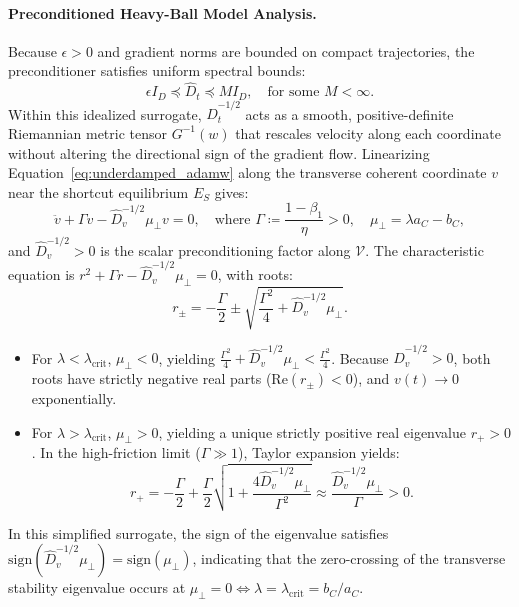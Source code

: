 \documentclass{article}
\theoremstyle{plain}
\theoremstyle{definition}
\begin{document}
\paragraph{Preconditioned Heavy-Ball Model Analysis.}
Because $\epsilon > 0$ and gradient norms are bounded on compact trajectories, the preconditioner satisfies uniform spectral bounds:
\begin{equation}
    \epsilon I_D \preceq \hat{D}_t \preceq M I_D, \quad \text{for some } M < \infty.
\end{equation}
Within this idealized surrogate, $\hat{D}_t^{-1/2}$ acts as a smooth, positive-definite Riemannian metric tensor $G^{-1}(w)$ that rescales velocity along each coordinate without altering the directional sign of the gradient flow.
Linearizing Equation~\eqref{eq:underdamped_adamw} along the transverse coherent coordinate $v$ near the shortcut equilibrium $E_S$ gives:
\begin{equation}
    \ddot{v} + \Gamma \dot{v} - \hat{D}_v^{-1/2} \mu_{\perp} v = 0, \quad \text{where } \Gamma \coloneqq \frac{1 - \beta_1}{\eta} > 0, \quad \mu_{\perp} = \lambda a_C - b_C,
\end{equation}
and $\hat{D}_v^{-1/2} > 0$ is the scalar preconditioning factor along $\mathcal{V}$.
The characteristic equation is $r^2 + \Gamma r - \hat{D}_v^{-1/2} \mu_{\perp} = 0$, with roots:
\begin{equation}
    r_{\pm} = -\frac{\Gamma}{2} \pm \sqrt{\frac{\Gamma^2}{4} + \hat{D}_v^{-1/2} \mu_{\perp}}.
\end{equation}
\begin{itemize}[leftmargin=*]
    \item For $\lambda < \lambda_{\text{crit}}$, $\mu_{\perp} < 0$, yielding $\frac{\Gamma^2}{4} + \hat{D}_v^{-1/2} \mu_{\perp} < \frac{\Gamma^2}{4}$. Because $\hat{D}_v^{-1/2} > 0$, both roots have strictly negative real parts ($\text{Re}(r_{\pm}) < 0$), and $v(t) \to 0$ exponentially.
    \item For $\lambda > \lambda_{\text{crit}}$, $\mu_{\perp} > 0$, yielding a unique strictly positive real eigenvalue $r_+ > 0$. In the high-friction limit ($\Gamma \gg 1$), Taylor expansion yields:
    \begin{equation}
        r_+ = -\frac{\Gamma}{2} + \frac{\Gamma}{2} \sqrt{1 + \frac{4 \hat{D}_v^{-1/2} \mu_{\perp}}{\Gamma^2}} \approx \frac{\hat{D}_v^{-1/2} \mu_{\perp}}{\Gamma} > 0.
    \end{equation}
\end{itemize}
In this simplified surrogate, the sign of the eigenvalue satisfies $\text{sign}(\hat{D}_v^{-1/2} \mu_\perp) = \text{sign}(\mu_\perp)$, indicating that the zero-crossing of the transverse stability eigenvalue occurs at $\mu_\perp = 0 \iff \lambda = \lambda_{\text{crit}} = b_C / a_C$.
\end{document}
